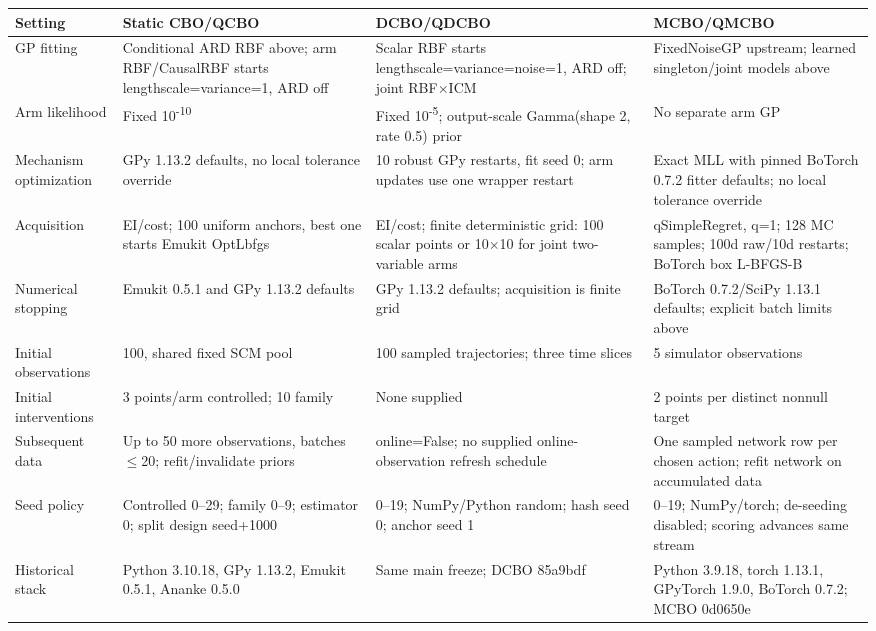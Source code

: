 \begingroup\small\setlength{\tabcolsep}{3pt}
\begin{longtable}{@{}p{.16\linewidth}p{.26\linewidth}p{.26\linewidth}p{.26\linewidth}@{}}
\hline
Setting & Static CBO/QCBO & DCBO/QDCBO & MCBO/QMCBO \\
\hline
GP fitting & Conditional ARD RBF above; arm RBF/CausalRBF starts lengthscale=variance=1, ARD off & Scalar RBF starts lengthscale=variance=noise=1, ARD off; joint RBF\ensuremath{\times}ICM & FixedNoiseGP upstream; learned singleton/joint models above \\
Arm likelihood & Fixed 10\textsuperscript{-}\textsuperscript{1}\textsuperscript{0} & Fixed 10\textsuperscript{-}\textsuperscript{5}; output-scale Gamma(shape 2, rate 0.5) prior & No separate arm GP \\
Mechanism optimization & GPy 1.13.2 defaults, no local tolerance override & 10 robust GPy restarts, fit seed 0; arm updates use one wrapper restart & Exact MLL with pinned BoTorch 0.7.2 fitter defaults; no local tolerance override \\
Acquisition & EI/cost; 100 uniform anchors, best one starts Emukit OptLbfgs & EI/cost; finite deterministic grid: 100 scalar points or 10\ensuremath{\times}10 for joint two-variable arms & qSimpleRegret, q=1; 128 MC samples; 100d raw/10d restarts; BoTorch box L-BFGS-B \\
Numerical stopping & Emukit 0.5.1 and GPy 1.13.2 defaults & GPy 1.13.2 defaults; acquisition is finite grid & BoTorch 0.7.2/SciPy 1.13.1 defaults; explicit batch limits above \\
Initial observations & 100, shared fixed SCM pool & 100 sampled trajectories; three time slices & 5 simulator observations \\
Initial interventions & 3 points/arm controlled; 10 family & None supplied & 2 points per distinct nonnull target \\
Subsequent data & Up to 50 more observations, batches \ensuremath{\leq}20; refit/invalidate priors & online=False; no supplied online-observation refresh schedule & One sampled network row per chosen action; refit network on accumulated data \\
Seed policy & Controlled 0--29; family 0--9; estimator 0; split design seed+1000 & 0--19; NumPy/Python random; hash seed 0; anchor seed 1 & 0--19; NumPy/torch; de-seeding disabled; scoring advances same stream \\
Historical stack & Python 3.10.18, GPy 1.13.2, Emukit 0.5.1, Ananke 0.5.0 & Same main freeze; DCBO 85a9bdf & Python 3.9.18, torch 1.13.1, GPyTorch 1.9.0, BoTorch 0.7.2; MCBO 0d0650e \\
\hline\end{longtable}\endgroup

